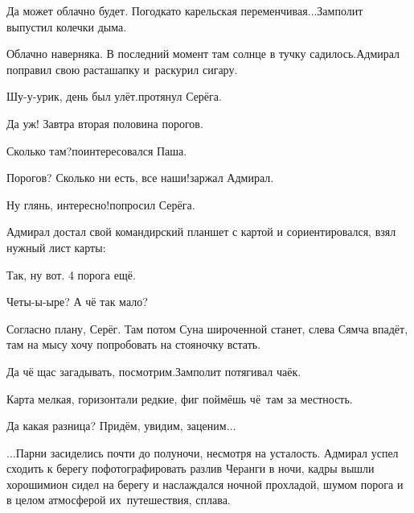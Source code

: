 \diagdash Да может облачно будет. Погодка\sdash то карельская переменчивая$\ldots$\mdash Замполит выпустил колечки дыма.

\diagdash Облачно наверняка. В последний момент там солнце в тучку садилось.\mdash Адмирал поправил свою раста\sdash шапку и~раскурил сигару. 

\diagdash Шу-у-урик, день был улёт.\mdash протянул Серёга.

\diagdash Да уж! Завтра вторая половина порогов.

\diagdash Сколько там?\mdash поинтересовался Паша.

\diagdash Порогов? Сколько ни есть, все наши!\mdash заржал Адмирал.

\diagdash Ну глянь, интересно!\mdash попросил Серёга.

Адмирал достал свой командирский планшет с картой и сориентировался, взял нужный лист карты:

\diagdash Так, ну вот. 4 порога ещё.

\diagdash Четы-ы-ыре? А чё так мало?

\diagdash Согласно плану, Серёг. Там потом Суна широченной станет, слева Сямча впадёт, там на мысу хочу попробовать на стояночку встать.

\diagdash Да чё щас загадывать, посмотрим.\mdash Замполит потягивал чаёк.

\diagdash Карта мелкая, горизонтали редкие, фиг поймёшь чё~там за местность.

\diagdash Да какая разница? Придём, увидим, заценим$\ldots$

$\ldots$Парни засиделись почти до полуночи, несмотря на усталость. Адмирал успел сходить к берегу пофотографировать разлив Черанги в ночи, кадры вышли хорошими\mdash он сидел на берегу и наслаждался ночной прохладой, шумом порога и в целом атмосферой их~путешествия, сплава. 















\begin{center}
\end{center}
